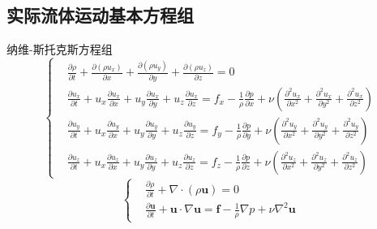 \subsection{实际流体运动基本方程组}
\begin{frame}{纳维-斯托克斯方程组}
  \vspace*{-1.5em}
  \begin{equation*}
    \left\{
      \begin{aligned}
      &\frac{\partial \rho}{\partial t}
      +
      \frac{\partial (\rho u_{x})}{\partial x}
      +
      \frac{\partial (\rho u_{y})}{\partial y}
      +
      \frac{\partial (\rho u_{z})}{\partial z}
      =
      0
      \\
      &
      \frac{\partial u_{x}}{\partial t}
      +
      u_{x}\frac{\partial u_{x}}{\partial x}
      +
      u_{y}\frac{\partial u_{x}}{\partial y}
      +
      u_{z}\frac{\partial u_{x}}{\partial z}
      =
      f_{x}
      -
      \frac{1}{\rho}\frac{\partial p}{\partial x}
      +
      \nu
      \left(
        \frac{\partial^{2} u_{x}}{\partial x^{2}}
        +
        \frac{\partial^{2} u_{x}}{\partial y^{2}}
        +
        \frac{\partial^{2} u_{x}}{\partial z^{2}}
      \right)
      \\
      &
      \frac{\partial u_{y}}{\partial t}
      +
      u_{x}\frac{\partial u_{y}}{\partial x}
      +
      u_{y}\frac{\partial u_{y}}{\partial y}
      +
      u_{z}\frac{\partial u_{y}}{\partial z}
      =
      f_{y}
      -
      \frac{1}{\rho}\frac{\partial p}{\partial y}
      +
      \nu
      \left(
        \frac{\partial^{2} u_{y}}{\partial x^{2}}
        +
        \frac{\partial^{2} u_{y}}{\partial y^{2}}
        +
        \frac{\partial^{2} u_{y}}{\partial z^{2}}
      \right)
      \\
      &
      \frac{\partial u_{z}}{\partial t}
      +
      u_{x}\frac{\partial u_{z}}{\partial x}
      +
      u_{y}\frac{\partial u_{z}}{\partial y}
      +
      u_{z}\frac{\partial u_{z}}{\partial z}
      =
      f_{z}
      -
      \frac{1}{\rho}\frac{\partial p}{\partial z}
      +
      \nu
      \left(
        \frac{\partial^{2} u_{z}}{\partial x^{2}}
        +
        \frac{\partial^{2} u_{z}}{\partial y^{2}}
        +
        \frac{\partial^{2} u_{z}}{\partial z^{2}}
      \right)
      \end{aligned}
      \right.
  \end{equation*}
  \begin{equation*}
    \left\{
      \begin{aligned}
    &\frac{\partial \rho}{\partial t}
    +
    \nabla\cdot(\rho\bm{u})
    =
    0
    \\
    &\frac{\partial \bm{u}}{\partial t}
    +
    \bm{u}\cdot \nabla\bm{u}
    =
    \bm{f}
    -
    \frac{1}{\rho}\nabla p
    +
    \nu\nabla^{2}\bm{u}
      \end{aligned}
      \right.
  \end{equation*}
\end{frame}

